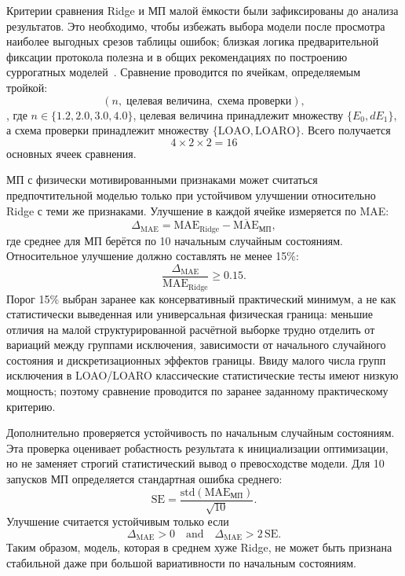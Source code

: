 Критерии сравнения Ridge и МП малой ёмкости были зафиксированы до анализа результатов. Это
необходимо, чтобы избежать выбора модели после просмотра наиболее выгодных срезов таблицы
ошибок; близкая логика предварительной фиксации протокола полезна и в общих рекомендациях
по построению суррогатных моделей~\cite{hou2024surrogateprotocol}. Сравнение проводится по
ячейкам, определяемым тройкой:
\[
  (n,\; \text{целевая величина},\; \text{схема проверки}),
\],
где $n \in \{1.2,2.0,3.0,4.0\}$, целевая величина принадлежит множеству $\{E_0,dE_1\}$, а
схема проверки принадлежит множеству $\{\mathrm{LOAO},\mathrm{LOARO}\}$. Всего получается
\[
  4 \times 2 \times 2 = 16
\]
основных ячеек сравнения.

МП с физически мотивированными признаками может считаться предпочтительной моделью только
при устойчивом улучшении относительно Ridge с теми же признаками. Улучшение в каждой
ячейке измеряется по MAE:
\begin{equation}
  \Delta_{\mathrm{MAE}}
  =
  \mathrm{MAE}_{\mathrm{Ridge}}
  -
  \overline{\mathrm{MAE}}_{\text{МП}},
\end{equation}
где среднее для МП берётся по 10 начальным случайным состояниям. Относительное улучшение
должно составлять не менее 15\%:
\begin{equation}
  \frac{\Delta_{\mathrm{MAE}}}{\mathrm{MAE}_{\mathrm{Ridge}}}
  \geq 0.15 .
\end{equation}
Порог 15\% выбран заранее как консервативный практический минимум, а не как статистически
выведенная или универсальная физическая граница: меньшие отличия на малой
структурированной расчётной выборке трудно отделить от вариаций между группами исключения,
зависимости от начального случайного состояния и дискретизационных эффектов границы. Ввиду
малого числа групп исключения в LOAO/LOARO классические статистические тесты имеют низкую
мощность; поэтому сравнение проводится по заранее заданному практическому критерию.

Дополнительно проверяется устойчивость по начальным случайным состояниям. Эта проверка
оценивает робастность результата к инициализации оптимизации, но не заменяет строгий
статистический вывод о превосходстве модели. Для 10 запусков МП определяется стандартная
ошибка среднего:
\begin{equation}
  \mathrm{SE}
  =
  \frac{\mathrm{std}(\mathrm{MAE}_{\text{МП}})}{\sqrt{10}} .
\end{equation}
Улучшение считается устойчивым только если
\begin{equation}
  \Delta_{\mathrm{MAE}} > 0
  \quad \mathrm{and} \quad
  \Delta_{\mathrm{MAE}} > 2\,\mathrm{SE}.
\end{equation}
Таким образом, модель, которая в среднем хуже Ridge, не может быть признана стабильной
даже при большой вариативности по начальным состояниям.

